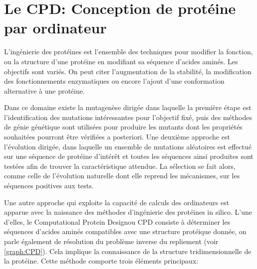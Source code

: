 \chapter{Le \og CPD\fg: Conception de protéine par ordinateur}
\label{chap:CPD}
L'ingénierie des protéines est l'ensemble des techniques pour modifier la fonction, ou la structure d'une protéine en modifiant sa séquence d'acides aminés. Les objectifs sont variés. On peut citer l'augmentation de la stabilité, la modification des fonctionnements enzymatiques ou encore l'ajout d'une conformation alternative à une protéine.

Dans ce domaine existe la mutagenèse dirigée dans laquelle la première étape est l'identification des mutations intéressantes pour l'objectif fixé, puis des méthodes de génie génétique sont utilisées pour produire les mutants dont les propriétés souhaitées pourront être vérifiées a posteriori. Une deuxième approche est l'évolution dirigée, dans laquelle un ensemble de mutations aléatoires est effectué sur une séquence de protéine d'intérêt et toutes les séquences ainsi produites sont testées afin de trouver la caractéristique attendue. La sélection se fait alors, comme celle de l'évolution naturelle dont elle reprend les mécanismes, sur les séquences positives aux tests.

Une autre approche qui exploite la capacité de calculs des ordinateurs est apparue avec la naissance des méthodes d'ingénierie des protéines \og in silico\fg. L'une d'elles, le \og Computational Protein Design\fg ou CPD consiste à déterminer les séquences d'acides aminés compatibles avec une structure protéique donnée, on parle également de résolution du problème inverse du repliement (voir \ref{graph:CPD}). Cela implique la connaissance de la structure tridimensionnelle de la protéine. Cette méthode comporte trois éléments principaux:

